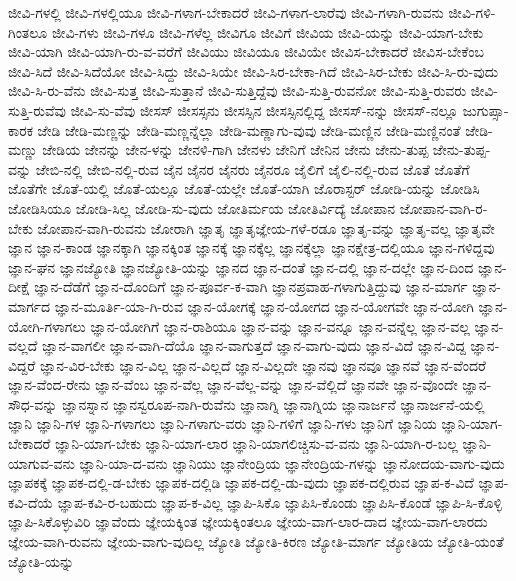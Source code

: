 {ಜೀವಿ-ಗಳಲ್ಲಿ
ಜೀವಿ-ಗಳಲ್ಲಿಯೂ
ಜೀವಿ-ಗಳಾಗ-ಬೇಕಾದರೆ
ಜೀವಿ-ಗಳಾಗ-ಲಾರೆವು
ಜೀವಿ-ಗಳಾಗಿ-ರುವನು
ಜೀವಿ-ಗಳಿ-ಗಿಂತಲೂ
ಜೀವಿ-ಗಳು
ಜೀವಿ-ಗಳೂ
ಜೀವಿ-ಗಳೆಲ್ಲ
ಜೀವಿಗೂ
ಜೀವಿಗೆ
ಜೀವಿಯ
ಜೀವಿ-ಯನ್ನು
ಜೀವಿ-ಯಾಗ-ಬೇಕು
ಜೀವಿ-ಯಾಗಿ
ಜೀವಿ-ಯಾಗಿ-ರು-ವ-ವರೆಗೆ
ಜೀವಿಯು
ಜೀವಿಯೂ
ಜೀವಿಯೇ
ಜೀವಿಸ-ಬೇಕಾದರೆ
ಜೀವಿಸ-ಬೇಕೆಂಬ
ಜೀವಿ-ಸಿದೆ
ಜೀವಿ-ಸಿದೆಯೋ
ಜೀವಿ-ಸಿದ್ದು
ಜೀವಿ-ಸಿಯೇ
ಜೀವಿ-ಸಿರ-ಬೇಕಾ-ಗಿದೆ
ಜೀವಿ-ಸಿರ-ಬೇಕು
ಜೀವಿ-ಸಿ-ರು-ವುದು
ಜೀವಿ-ಸಿ-ರು-ವೆನು
ಜೀವಿ-ಸುತ್ತ
ಜೀವಿ-ಸುತ್ತಾನೆ
ಜೀವಿ-ಸುತ್ತಿದ್ದೆವು
ಜೀವಿ-ಸುತ್ತಿ-ರುವನೋ
ಜೀವಿ-ಸುತ್ತಿ-ರುವರು
ಜೀವಿ-ಸುತ್ತಿ-ರುವೆವು
ಜೀವಿ-ಸು-ವೆವು
ಜೀಸಸ್
ಜೀಸಸ್ಸನು
ಜೀಸಸ್ಸಿನ
ಜೀಸಸ್ಸಿನಲ್ಲಿದ್ದ
ಜೀಸಸ್-ನನ್ನು
ಜೀಸಸ್-ನಲ್ಲೂ
ಜುಗುಪ್ಸಾ-ಕಾರಕ
ಜೇಡಿ
ಜೇಡಿ-ಮಣ್ಣನ್ನು
ಜೇಡಿ-ಮಣ್ಣನ್ನೆಲ್ಲಾ
ಜೇಡಿ-ಮಣ್ಣಾಗು-ವುವು
ಜೇಡಿ-ಮಣ್ಣಿನ
ಜೇಡಿ-ಮಣ್ಣಿನಂತೆ
ಜೇಡಿ-ಮಣ್ಣು
ಜೇಡಿಯ
ಜೇನನ್ನು
ಜೇನ-ಳನ್ನು
ಜೇನಳಿ-ಗಾಗಿ
ಜೇನಳು
ಜೇನಿಗೆ
ಜೇನಿನ
ಜೇನು
ಜೇನು-ತುಪ್ಪ
ಜೇನು-ತುಪ್ಪ-ವನ್ನು
ಜೇಬಿ-ನಲ್ಲಿ
ಜೇಬಿ-ನಲ್ಲಿ-ರುವ
ಜೈನ
ಜೈನರ
ಜೈನರು
ಜೈನರೂ
ಜೈಲಿಗೆ
ಜೈಲಿ-ನಲ್ಲಿ-ರುವ
ಜೊತೆ
ಜೊತೆಗೆ
ಜೊತೆಗೇ
ಜೊತೆ-ಯಲ್ಲಿ
ಜೊತೆ-ಯಲ್ಲೂ
ಜೊತೆ-ಯಲ್ಲೇ
ಜೊತೆ-ಯಾಗಿ
ಜೊರಾಸ್ಟರ್
ಜೋಡಿ-ಯನ್ನು
ಜೋಡಿಸಿ
ಜೋಡಿಸಿಯೂ
ಜೋಡಿ-ಸಿಲ್ಲ
ಜೋಡಿ-ಸು-ವುದು
ಜೋತಿರ್ಮಯ
ಜೋತಿರ್ವಿದ್ಯೆ
ಜೋಪಾನ
ಜೋಪಾನ-ವಾಗಿ-ರ-ಬೇಕು
ಜೋಪಾನ-ವಾಗಿ-ರುವನು
ಜೋರಾಗಿ
ಜ್ಞಾತೃ
ಜ್ಞಾತೃಜ್ಞೇಯ-ಗಳೆ-ರಡೂ
ಜ್ಞಾತೃ-ವನ್ನು
ಜ್ಞಾತೃ-ವಲ್ಲ
ಜ್ಞಾತೃವೇ
ಜ್ಞಾನ
ಜ್ಞಾನ-ಕಾಂಡ
ಜ್ಞಾನಕ್ಕಾಗಿ
ಜ್ಞಾನಕ್ಕಿಂತ
ಜ್ಞಾನಕ್ಕೆ
ಜ್ಞಾನಕ್ಕೆಲ್ಲ
ಜ್ಞಾನಕ್ಕೆಲ್ಲಾ
ಜ್ಞಾನಕ್ಷೇತ್ರ-ದಲ್ಲಿಯೂ
ಜ್ಞಾನ-ಗಳಿದ್ದವು
ಜ್ಞಾನ-ಘನ
ಜ್ಞಾನಜ್ಯೋತಿ
ಜ್ಞಾನಜ್ಯೋತಿ-ಯನ್ನು
ಜ್ಞಾನದ
ಜ್ಞಾನ-ದಂತೆ
ಜ್ಞಾನ-ದಲ್ಲಿ
ಜ್ಞಾನ-ದಲ್ಲೇ
ಜ್ಞಾನ-ದಿಂದ
ಜ್ಞಾನ-ದೀಕ್ಷೆ
ಜ್ಞಾನ-ದೆಡೆಗೆ
ಜ್ಞಾನ-ದೊಂದಿಗೆ
ಜ್ಞಾನ-ಪೂರ್ವ-ಕ-ವಾಗಿ
ಜ್ಞಾನಪ್ರವಾಹ-ಗಳಾಗುತ್ತಿದ್ದುವು
ಜ್ಞಾನ-ಮಾರ್ಗ
ಜ್ಞಾನ-ಮಾರ್ಗದ
ಜ್ಞಾನ-ಮೂರ್ತಿ-ಯಾ-ಗಿ-ರುವ
ಜ್ಞಾನ-ಯೋಗಕ್ಕೆ
ಜ್ಞಾನ-ಯೋಗದ
ಜ್ಞಾನ-ಯೋಗವೇ
ಜ್ಞಾನ-ಯೋಗಿ
ಜ್ಞಾನ-ಯೋಗಿ-ಗಳಾಗಲು
ಜ್ಞಾನ-ಯೋಗಿಗೆ
ಜ್ಞಾನ-ರಾಶಿಯೂ
ಜ್ಞಾನ-ವನ್ನು
ಜ್ಞಾನ-ವನ್ನೂ
ಜ್ಞಾನ-ವನ್ನೆಲ್ಲ
ಜ್ಞಾನ-ವಲ್ಲ
ಜ್ಞಾನ-ವಲ್ಲದೆ
ಜ್ಞಾನ-ವಾಗಲೀ
ಜ್ಞಾನ-ವಾಗಿ-ದೆಯೊ
ಜ್ಞಾನ-ವಾಗುತ್ತದೆ
ಜ್ಞಾನ-ವಾಗು-ವುದು
ಜ್ಞಾನ-ವಿದೆ
ಜ್ಞಾನ-ವಿದ್ದ
ಜ್ಞಾನ-ವಿದ್ದರೆ
ಜ್ಞಾನ-ವಿರ-ಬೇಕು
ಜ್ಞಾನ-ವಿಲ್ಲ
ಜ್ಞಾನ-ವಿಲ್ಲದೆ
ಜ್ಞಾನ-ವಿಲ್ಲದೇ
ಜ್ಞಾನವು
ಜ್ಞಾನವೂ
ಜ್ಞಾನವೆ
ಜ್ಞಾನ-ವೆಂದರೆ
ಜ್ಞಾನ-ವೆಂದ-ರೇನು
ಜ್ಞಾನ-ವೆಂಬ
ಜ್ಞಾನ-ವೆಲ್ಲ
ಜ್ಞಾನ-ವೆಲ್ಲ-ವನ್ನು
ಜ್ಞಾನ-ವೆಲ್ಲಿದೆ
ಜ್ಞಾನವೇ
ಜ್ಞಾನ-ವೊಂದೇ
ಜ್ಞಾನ-ಸೌಧ-ವನ್ನು
ಜ್ಞಾನಸ್ನಾನ
ಜ್ಞಾನಸ್ವರೂಪ-ನಾಗಿ-ರುವೆನು
ಜ್ಞಾನಾಗ್ನಿ
ಜ್ಞಾನಾಗ್ನಿಯ
ಜ್ಞಾನಾರ್ಜನೆ
ಜ್ಞಾನಾರ್ಜನೆ-ಯಲ್ಲಿ
ಜ್ಞಾನಿ
ಜ್ಞಾನಿ-ಗಳ
ಜ್ಞಾನಿ-ಗಳಾಗಲು
ಜ್ಞಾನಿ-ಗಳಾಗು-ವರು
ಜ್ಞಾನಿ-ಗಳಿಗೆ
ಜ್ಞಾನಿ-ಗಳು
ಜ್ಞಾನಿಗೆ
ಜ್ಞಾನಿಯ
ಜ್ಞಾನಿ-ಯಾಗ-ಬೇಕಾದರೆ
ಜ್ಞಾನಿ-ಯಾಗ-ಬೇಕು
ಜ್ಞಾನಿ-ಯಾಗ-ಲಾರ
ಜ್ಞಾನಿ-ಯಾಗಲಿಚ್ಚಿಸು-ವ-ವನು
ಜ್ಞಾನಿ-ಯಾಗಿ-ರ-ಬಲ್ಲ
ಜ್ಞಾನಿ-ಯಾಗುವ-ವನು
ಜ್ಞಾನಿ-ಯಾ-ದ-ವನು
ಜ್ಞಾನಿಯು
ಜ್ಞಾನೇಂದ್ರಿಯ
ಜ್ಞಾನೇಂದ್ರಿಯ-ಗಳನ್ನು
ಜ್ಞಾನೋದಯ-ವಾಗು-ವುದು
ಜ್ಞಾಪಕಕ್ಕೆ
ಜ್ಞಾಪಕ-ದಲ್ಲಿ-ಡ-ಬೇಕು
ಜ್ಞಾಪಕ-ದಲ್ಲಿಡಿ
ಜ್ಞಾಪಕ-ದಲ್ಲಿ-ಡು-ವುದು
ಜ್ಞಾಪಕ-ದಲ್ಲಿರುವ
ಜ್ಞಾಪ-ಕ-ವಿದೆ
ಜ್ಞಾಪ-ಕವಿ-ದೆಯೆ
ಜ್ಞಾಪ-ಕವಿ-ರ-ಬಹುದು
ಜ್ಞಾಪ-ಕ-ವಿಲ್ಲ
ಜ್ಞಾಪಿ-ಸಿಕೊ
ಜ್ಞಾಪಿಸಿ-ಕೊಂಡು
ಜ್ಞಾಪಿಸಿ-ಕೊಂಡೆ
ಜ್ಞಾಪಿ-ಸಿ-ಕೊಳ್ಳಿ
ಜ್ಞಾಪಿ-ಸಿಕೊಳ್ಳುವಿರಿ
ಜ್ಞಾವೆಂದು
ಜ್ಞೇಯಕ್ಕಿಂತ
ಜ್ಞೇಯಕ್ಕಿಂತಲೂ
ಜ್ಞೇಯ-ವಾಗ-ಲಾರ-ದಾದ
ಜ್ಞೇಯ-ವಾಗ-ಲಾರದು
ಜ್ಞೇಯ-ವಾಗಿ-ರುವನು
ಜ್ಞೇಯ-ವಾಗು-ವುದಿಲ್ಲ
ಜ್ಯೋತಿ
ಜ್ಯೋತಿ-ಕಿರಣ
ಜ್ಯೋತಿ-ಮಾರ್ಗ
ಜ್ಯೋತಿಯ
ಜ್ಯೋತಿ-ಯಂತೆ
ಜ್ಯೋತಿ-ಯನ್ನು
}
